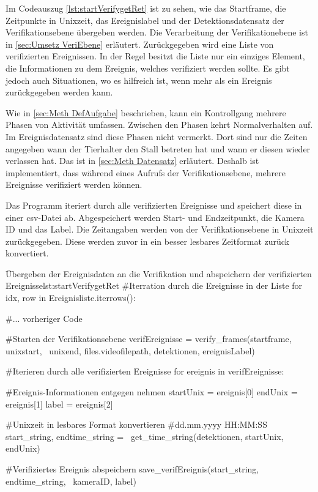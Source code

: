 Im Codeauszug \ref{lst:startVerifygetRet} ist zu sehen, wie das Startframe, die Zeitpunkte in Unixzeit, das Ereignislabel und der Detektionsdatensatz der Verifikationsebene übergeben werden. Die Verarbeitung der Verifikationebene ist in \ref{sec:Umsetz VeriEbene} erläutert. Zurückgegeben wird eine Liste von verifizierten Ereignissen. In der Regel besitzt die Liste nur ein einziges Element, die Informationen zu dem Ereignis, welches verifiziert werden sollte. Es gibt jedoch auch Situationen, wo es hilfreich ist, wenn mehr als ein Ereignis zurückgegeben werden kann. \par

Wie in \ref{sec:Meth DefAufgabe} beschrieben, kann ein Kontrollgang mehrere Phasen von Aktivität umfassen. Zwischen den Phasen kehrt Normalverhalten auf. Im Ereignisdatensatz sind diese Phasen nicht vermerkt. Dort sind nur die Zeiten angegeben wann der Tierhalter den Stall betreten hat und wann er diesen wieder verlassen hat. Das ist in \ref{sec:Meth Datensatz} erläutert. Deshalb ist implementiert, dass während eines Aufrufs der Verifikationsebene, mehrere Ereignisse verifiziert werden können. \par

Das Programm iteriert durch alle verifizierten Ereignisse und speichert diese in einer csv-Datei ab. Abgespeichert werden Start- und Endzeitpunkt, die Kamera ID und das Label. Die Zeitangaben werden von der Verifikationsebene in Unixzeit zurückgegeben. Diese werden zuvor in ein besser lesbares Zeitformat zurück konvertiert. 

\begin{pythoncode}{Übergeben der Ereignisdaten an die Verifikation und abspeichern der verifizierten Ereignisse}{lst:startVerifygetRet}
#Iterration durch die Ereignisse in der Liste
for idx, row in Ereignisliste.iterrows():  

    #... vorheriger Code

    #Starten der Verifikationsebene
    verifEreignisse = verify_frames(startframe, unixstart, \ 
        unixend, files.videofilepath, detektionen, ereignisLabel)

    #Iterieren durch alle verifizierten Ereignisse 
    for ereignis in verifEreignisse:  

        #Ereignis-Informationen entgegen nehmen        
        startUnix = ereignis[0]      
        endUnix = ereignis[1]
        label = ereignis[2]

        #Unixzeit in lesbares Format konvertieren
        #dd.mm.yyyy HH:MM:SS 
        start_string, endtime_string = \ 
            get_time_string(detektionen, startUnix, endUnix)

        #Verifiziertes Ereignis abspeichern 
        save_verifEreignis(start_string, endtime_string, \ 
            kameraID, label)
\end{pythoncode}


